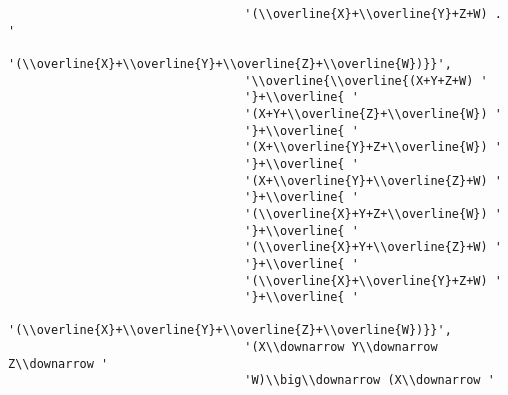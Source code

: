 \begin{verbatim}
                                 '(\\overline{X}+\\overline{Y}+Z+W) . '
                                 '(\\overline{X}+\\overline{Y}+\\overline{Z}+\\overline{W})}}',
                                 '\\overline{\\overline{(X+Y+Z+W) '
                                 '}+\\overline{ '
                                 '(X+Y+\\overline{Z}+\\overline{W}) '
                                 '}+\\overline{ '
                                 '(X+\\overline{Y}+Z+\\overline{W}) '
                                 '}+\\overline{ '
                                 '(X+\\overline{Y}+\\overline{Z}+W) '
                                 '}+\\overline{ '
                                 '(\\overline{X}+Y+Z+\\overline{W}) '
                                 '}+\\overline{ '
                                 '(\\overline{X}+Y+\\overline{Z}+W) '
                                 '}+\\overline{ '
                                 '(\\overline{X}+\\overline{Y}+Z+W) '
                                 '}+\\overline{ '
                                 '(\\overline{X}+\\overline{Y}+\\overline{Z}+\\overline{W})}}',
                                 '(X\\downarrow Y\\downarrow Z\\downarrow '
                                 'W)\\big\\downarrow (X\\downarrow '

\end{verbatim}
